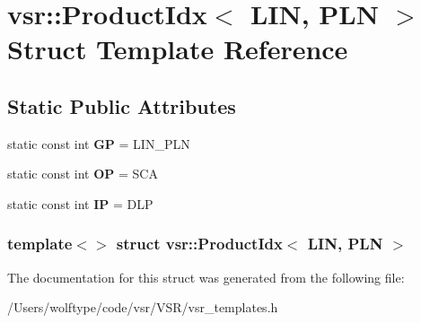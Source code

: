 \hypertarget{structvsr_1_1_product_idx_3_01_l_i_n_00_01_p_l_n_01_4}{\section{vsr\-:\-:Product\-Idx$<$ L\-I\-N, P\-L\-N $>$ Struct Template Reference}
\label{structvsr_1_1_product_idx_3_01_l_i_n_00_01_p_l_n_01_4}
}
\subsection*{Static Public Attributes}
\begin{DoxyCompactItemize}
\item 
\hypertarget{structvsr_1_1_product_idx_3_01_l_i_n_00_01_p_l_n_01_4_a68c159aa3ff9ba9f4b6648a644c50fc2}{static const int {\bfseries G\-P} = L\-I\-N\-\_\-\-P\-L\-N}\label{structvsr_1_1_product_idx_3_01_l_i_n_00_01_p_l_n_01_4_a68c159aa3ff9ba9f4b6648a644c50fc2}

\item 
\hypertarget{structvsr_1_1_product_idx_3_01_l_i_n_00_01_p_l_n_01_4_a9f54e43ac9b983068c21aff7d7735542}{static const int {\bfseries O\-P} = S\-C\-A}\label{structvsr_1_1_product_idx_3_01_l_i_n_00_01_p_l_n_01_4_a9f54e43ac9b983068c21aff7d7735542}

\item 
\hypertarget{structvsr_1_1_product_idx_3_01_l_i_n_00_01_p_l_n_01_4_a7386229b076caf6ef6682f98a3560324}{static const int {\bfseries I\-P} = D\-L\-P}\label{structvsr_1_1_product_idx_3_01_l_i_n_00_01_p_l_n_01_4_a7386229b076caf6ef6682f98a3560324}

\end{DoxyCompactItemize}
\subsubsection*{template$<$$>$ struct vsr\-::\-Product\-Idx$<$ L\-I\-N, P\-L\-N $>$}



The documentation for this struct was generated from the following file\-:\begin{DoxyCompactItemize}
\item 
/\-Users/wolftype/code/vsr/\-V\-S\-R/vsr\-\_\-templates.\-h\end{DoxyCompactItemize}
